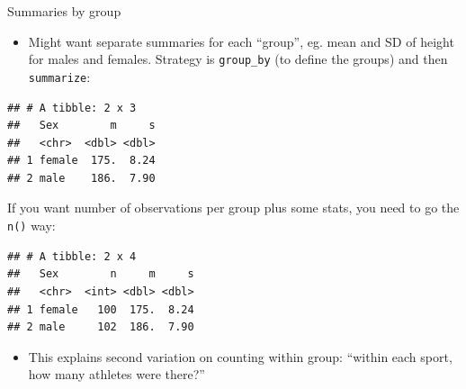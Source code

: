 \documentclass[ignorenonframetext,]{beamer}
\newenvironment{Shaded}{\begin{snugshade}}{\end{snugshade}}
\newcommand{\DataTypeTok}[1]{\textcolor[rgb]{0.13,0.29,0.53}{#1}}
\newcommand{\KeywordTok}[1]{\textcolor[rgb]{0.13,0.29,0.53}{\textbf{#1}}}
\newcommand{\NormalTok}[1]{#1}
\newcommand{\OperatorTok}[1]{\textcolor[rgb]{0.81,0.36,0.00}{\textbf{#1}}}
\newcommand{\StringTok}[1]{\textcolor[rgb]{0.31,0.60,0.02}{#1}}
\providecommand{\tightlist}{%
  \setlength{\itemsep}{0pt}\setlength{\parskip}{0pt}}
\begin{document}
\begin{frame}[fragile]{Summaries by group}
\protect\hypertarget{summaries-by-group}{}

\begin{itemize}
\tightlist
\item
  Might want separate summaries for each ``group'', eg. mean and SD of
  height for males and females. Strategy is \texttt{group\_by} (to
  define the groups) and then \texttt{summarize}:
\end{itemize}

\begin{Shaded}
\end{Shaded}

\begin{verbatim}
## # A tibble: 2 x 3
##   Sex        m     s
##   <chr>  <dbl> <dbl>
## 1 female  175.  8.24
## 2 male    186.  7.90
\end{verbatim}

If you want number of observations per group plus some stats, you need
to go the \texttt{n()} way:

\begin{Shaded}
\end{Shaded}

\begin{verbatim}
## # A tibble: 2 x 4
##   Sex        n     m     s
##   <chr>  <int> <dbl> <dbl>
## 1 female   100  175.  8.24
## 2 male     102  186.  7.90
\end{verbatim}

\begin{itemize}
\tightlist
\item
  This explains second variation on counting within group: ``within each
  sport, how many athletes were there?''
\end{itemize}

\end{frame}
\end{document}
